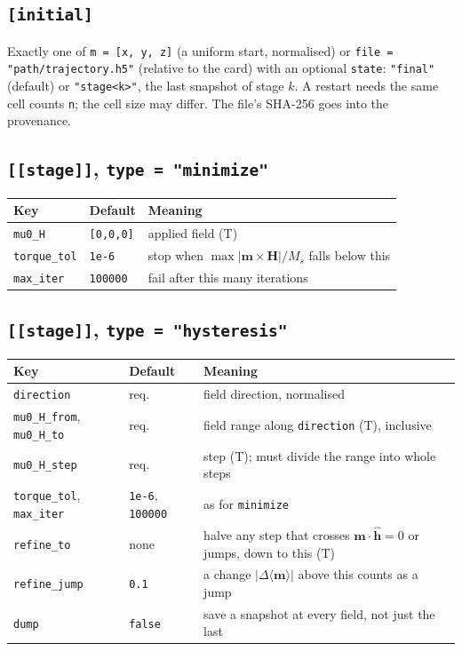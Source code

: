 \documentclass[10pt,a4paper]{article}
\newcommand{\code}[1]{\texttt{#1}}
\newcommand{\vm}{\mathbf{m}}
\newcommand{\vH}{\mathbf{H}}
\begin{document}
\subsection{\code{[initial]}}
Exactly one of \code{m = [x, y, z]} (a uniform start, normalised) or \code{file = "path/trajectory.h5"} (relative to
the card) with an optional \code{state}: \code{"final"} (default) or \code{"stage<k>"}, the last snapshot of stage $k$.
A restart needs the same cell counts \code{n}; the cell size may differ. The file's SHA-256 goes into the provenance.

\subsection{\code{[[stage]]}, \code{type = "minimize"}}
\begin{tabularx}{\textwidth}{@{}l l Y@{}}
\toprule
Key & Default & Meaning \\
\midrule
\code{mu0\_H} & \code{[0,0,0]} & applied field (T) \\
\code{torque\_tol} & \code{1e-6} & stop when $\max|\vm\times\vH|/M_s$ falls below this \\
\code{max\_iter} & \code{100000} & fail after this many iterations \\
\bottomrule
\end{tabularx}

\subsection{\code{[[stage]]}, \code{type = "hysteresis"}}
\begin{tabularx}{\textwidth}{@{}l l Y@{}}
\toprule
Key & Default & Meaning \\
\midrule
\code{direction} & req. & field direction, normalised \\
\code{mu0\_H\_from}, \code{mu0\_H\_to} & req. & field range along \code{direction} (T), inclusive \\
\code{mu0\_H\_step} & req. & step (T); must divide the range into whole steps \\
\code{torque\_tol}, \code{max\_iter} & \code{1e-6}, \code{100000} & as for \code{minimize} \\
\code{refine\_to} & none & halve any step that crosses $\vm\cdot\hat{\mathbf h}=0$ or jumps, down to this (T) \\
\code{refine\_jump} & \code{0.1} & a change $|\Delta\langle\vm\rangle|$ above this counts as a jump \\
\code{dump} & \code{false} & save a snapshot at every field, not just the last \\
\bottomrule
\end{tabularx}
\end{document}
